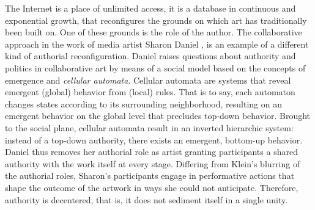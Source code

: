 
The Internet is a place of unlimited access, it is a database in continuous and exponential growth, that reconfigures the grounds on which art has traditionally been built on. One of these grounds is the role of the author. The collaborative approach in the work of media artist Sharon Daniel \parencite{Dan07:The}, is an example of a different kind of authorial reconfiguration. Daniel raises questions about authority and politics in collaborative art by means of a social model based on the concepts of emergence and \textit{cellular automata}. Cellular automata are systems that reveal emergent (global) behavior from (local) rules. That is to say, each automaton changes states according to its surrounding neighborhood, resulting on an emergent behavior on the global level that precludes top-down behavior. Brought to the social plane, cellular automata result in an inverted hierarchic system: instead of a top-down authority, there exists an emergent, bottom-up behavior. Daniel thus removes her authorial role as artist granting participants a shared authority with the work itself at every stage. Differing from Klein's blurring of the authorial roles, Sharon's participants engage in performative actions that shape the outcome of the artwork in ways she could not anticipate. Therefore, authority is decentered, that is, it does not sediment itself in a single unity. 



